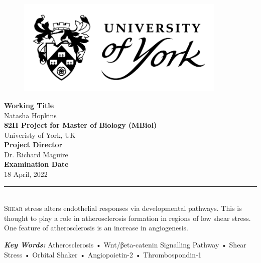 \documentclass[
  11pt,
]{article}
\author{}
\date{\vspace{-2.5em}}
\begin{document}
\captionsetup{justification=raggedright,singlelinecheck=false}

\begin{center}
\begin{figure}[h!]
\centering
  \includegraphics[width=10cm]{../images/uoy_logo.png}
  \label{}
\end{figure}
\vspace*{2\baselineskip}
\Large{\textbf{Working Title}}\\
Natasha Hopkins\\
\vspace*{2\baselineskip}
\Large{\textbf{82H Project for Master of Biology (MBiol)}}\\
\Large{Univeristy of York, UK}\\
\vspace*{2\baselineskip}
\Large{\textbf{Project Director}}\\
Dr. Richard Maguire\\
\vspace*{2\baselineskip}
\Large{\textbf{Examination Date}}\\
18 April, 2022
\end{center}

\hypersetup{linkcolor = black}
\newpage
\tableofcontents
\hypersetup{linkcolor = teal}

\newpage
\linenumbers
{}
\rule{\textwidth}{0.4pt}\\
\lettrine[lines=2,slope=0pt,nindent=0pt, loversize=0.2]{S}{hear} stress alters endothelial responses via developmental pathways. This is thought to play a role in atherosclerosis formation in regions of low shear stress. One feature of atherosclerosis is an increase in angiogenesis. \\

\begin{center}
\textbf{\textit{Key Words:}} Atherosclerosis • Wnt/βeta-catenin Signalling Pathway • Shear Stress • Orbital Shaker • Angiopoietin-2 • Thrombospondin-1\\
\end{center}
\end{document}

